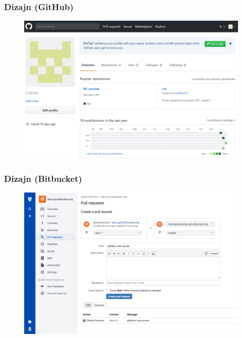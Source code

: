 \documentclass[12p, Times New Roman]{beamer}
\begin{document}
	\begin{frame} 			   %
		\frametitle{Dizajn (GitHub)}
		
		\begin{figure}
			\begin{center}
				\includegraphics[scale=0.22]{Git3.png}
			\end{center}
		\end{figure}

	\end{frame}                              




	\begin{frame}				%
		\frametitle{Dizajn (Bitbucket)} 	
		\begin{figure}
			\begin{center}
				\includegraphics[scale=0.12]{Shot2.png}
			\end{center}
		\end{figure}

	\end{frame}
\end{document}
